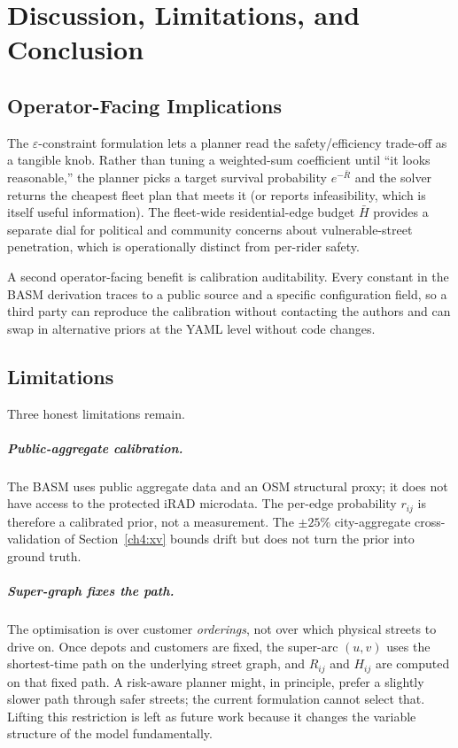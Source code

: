 \chapter{Discussion, Limitations, and Conclusion}

\section{Operator-Facing Implications}

The $\varepsilon$-constraint formulation lets a planner read the
safety/efficiency trade-off as a tangible knob. Rather than tuning a
weighted-sum coefficient until ``it looks reasonable,'' the planner
picks a target survival probability $e^{-\bar{R}}$ and the solver
returns the cheapest fleet plan that meets it (or reports
infeasibility, which is itself useful information). The fleet-wide
residential-edge budget $\bar{H}$ provides a separate dial for
political and community concerns about vulnerable-street penetration,
which is operationally distinct from per-rider safety.

A second operator-facing benefit is calibration auditability. Every
constant in the BASM derivation traces to a public source and a
specific configuration field, so a third party can reproduce the
calibration without contacting the authors and can swap in alternative
priors at the YAML level without code changes.

\section{Limitations}

Three honest limitations remain.

\paragraph{Public-aggregate calibration.}
The BASM uses public aggregate \citet{morth2022} data and an OSM
structural proxy; it does not have access to the protected iRAD
microdata. The per-edge probability $r_{ij}$ is therefore a
calibrated prior, not a measurement. The $\pm 25\%$ city-aggregate
cross-validation of Section~\ref{ch4:xv} bounds drift but does not
turn the prior into ground truth.

\paragraph{Super-graph fixes the path.}
The optimisation is over customer \emph{orderings}, not over which
physical streets to drive on. Once depots and customers are fixed,
the super-arc $(u,v)$ uses the shortest-time path on the underlying
street graph, and $R_{ij}$ and $H_{ij}$ are computed on that fixed
path. A risk-aware planner might, in principle, prefer a slightly
slower path through safer streets; the current formulation cannot
select that. Lifting this restriction is left as future work because
it changes the variable structure of the model fundamentally.

